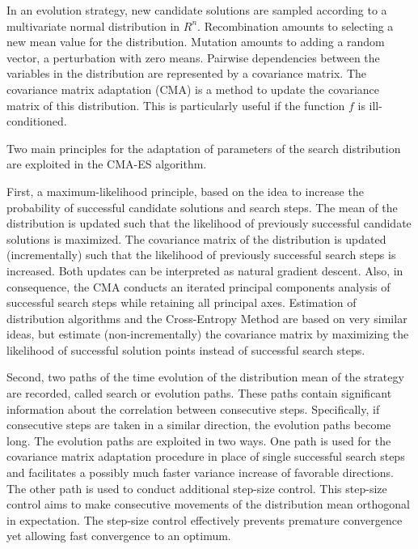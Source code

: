 In an evolution strategy, new candidate solutions are sampled according to a multivariate normal distribution in ${R}^{n}$. Recombination amounts to selecting a new mean value for the distribution. Mutation amounts to adding a random vector, a perturbation with zero means. Pairwise dependencies between the variables in the distribution are represented by a covariance matrix. The covariance matrix adaptation (CMA) is a method to update the covariance matrix of this distribution. This is particularly useful if the function $f$ is ill-conditioned.

Two main principles for the adaptation of parameters of the search distribution are exploited in the CMA-ES algorithm.

First, a maximum-likelihood principle, based on the idea to increase the probability of successful candidate solutions and search steps. The mean of the distribution is updated such that the likelihood of previously successful candidate solutions is maximized. The covariance matrix of the distribution is updated (incrementally) such that the likelihood of previously successful search steps is increased. Both updates can be interpreted as natural gradient descent. Also, in consequence, the CMA conducts an iterated principal components analysis of successful search steps while retaining all principal axes. Estimation of distribution algorithms and the Cross-Entropy Method are based on very similar ideas, but estimate (non-incrementally) the covariance matrix by maximizing the likelihood of successful solution points instead of successful search steps.

Second, two paths of the time evolution of the distribution mean of the strategy are recorded, called search or evolution paths. These paths contain significant information about the correlation between consecutive steps. Specifically, if consecutive steps are taken in a similar direction, the evolution paths become long. The evolution paths are exploited in two ways. One path is used for the covariance matrix adaptation procedure in place of single successful search steps and facilitates a possibly much faster variance increase of favorable directions. The other path is used to conduct additional step-size control. This step-size control aims to make consecutive movements of the distribution mean orthogonal in expectation. The step-size control effectively prevents premature convergence yet allowing fast convergence to an optimum.

